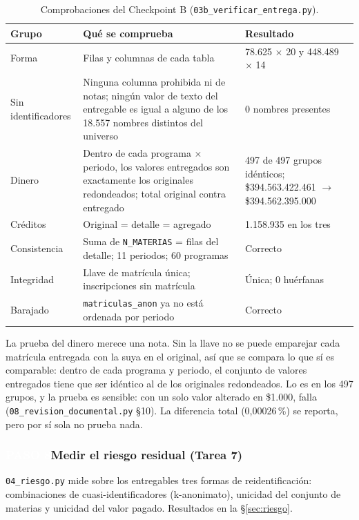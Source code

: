 \documentclass[11pt,a4paper,twoside,twocolumn]{article}
\newcommand{\cod}[1]{\nolinkurl{#1}}
\newcommand{\paso}[2]{\subsubsection*{\colorbox{ustaAzul}{\textcolor{white}{\scriptsize\sffamily\bfseries PASO #1}}\enspace #2}}
\newcommand{\cab}[1]{\textcolor{ustaAzul}{\textbf{#1}}}
\begin{document}
\begin{table}[tp]
\centering
\caption{Comprobaciones del Checkpoint B (\texttt{03b\_verificar\_entrega.py}).}
\label{tab:checkpointb}
\footnotesize
\setlength{\tabcolsep}{4pt}
\begin{tabularx}{\textwidth}{@{}P{2.4cm} L P{5.2cm}@{}}
\toprule
\cab{Grupo} & \cab{Qué se comprueba} & \cab{Resultado} \\
\midrule
Forma & Filas y columnas de cada tabla & 78.625 $\times$ 20 y 448.489 $\times$ 14 \\
Sin identificadores & Ninguna columna prohibida ni de notas; ningún valor de texto del entregable es igual a alguno de los 18.557 nombres distintos del universo & 0 nombres presentes \\
Dinero & Dentro de cada programa $\times$ periodo, los valores entregados son exactamente los originales redondeados; total original contra entregado & 497 de 497 grupos idénticos; \$394.563.422.461 $\to$ \$394.562.395.000 \\
Créditos & Original = detalle = agregado & 1.158.935 en los tres \\
Consistencia & Suma de \cod{N_MATERIAS} = filas del detalle; 11 periodos; 60 programas & Correcto \\
Integridad & Llave de matrícula única; inscripciones sin matrícula & Única; 0 huérfanas \\
Barajado & \cod{matriculas_anon} ya no está ordenada por periodo & Correcto \\
\bottomrule
\end{tabularx}
\end{table}

La prueba del dinero merece una nota. Sin la llave no se puede emparejar cada matrícula entregada
con la suya en el original, así que se compara lo que sí es comparable: dentro de cada programa y
periodo, el conjunto de valores entregados tiene que ser idéntico al de los originales
redondeados. Lo es en los 497 grupos, y la prueba es sensible: con un solo valor alterado en
\$1.000, falla (\cod{08_revision_documental.py} §10). La diferencia total (0,00026\,\%) se
reporta, pero por sí sola no prueba nada.

\paso{8}{Medir el riesgo residual (Tarea 7)}

\cod{04_riesgo.py} mide sobre los entregables tres formas de reidentificación: combinaciones de
cuasi-identificadores (k-anonimato), unicidad del conjunto de materias y unicidad del valor
pagado. Resultados en la §\ref{sec:riesgo}.
\end{document}
